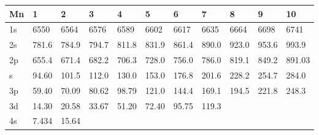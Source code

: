 \begin{table}
\begin{center}
\begin{tabular}{lllllllllll}
\hline
Mn&   1&   2&   3&   4&   5&   6&
7&   8&   9&  10\\
\hline
1s&  6550&  6564&  6576&  6589&  6602&  6617&  6635&  6664&  6698&  6741\\
2s&
781.6& 784.9& 794.7& 811.8& 831.9& 861.4& 890.0& 923.0& 953.6& 993.9\\
2p& 655.4& 671.4&
682.2& 706.3& 728.0& 756.0& 786.0& 819.1& 849.2& 891.03\\
s& 94.60& 101.5& 112.0& 130.0&
153.0& 176.8& 201.6& 228.2& 254.7& 284.0\\
3p& 59.40& 70.09& 80.62& 98.79& 121.0& 144.4&
169.1& 194.5& 221.8& 248.3\\
3d& 14.30& 20.58& 33.67& 51.20& 72.40& 95.75& 119.3\\
4s& 7.434&
15.64\\
\hline
\end{tabular}
\end{center}
\end{table}



